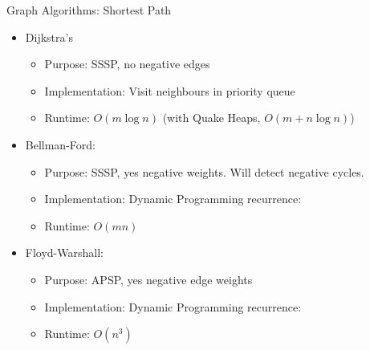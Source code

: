 \documentclass{beamer}
\begin{document}
\begin{frame}[t]{Graph Algorithms: Shortest Path}
  \begin{itemize}
    \item \alert{Dijkstra's}
    \begin{itemize}
        \item \alert{Purpose:} SSSP, no negative edges
        \item \alert{Implementation:} Visit neighbours in \alert{priority queue}
        \item \alert{Runtime:} $O(m \log n)$ (with \alert{Quake Heaps}, $O(m+n \log n)$)
    \end{itemize}
    \pause
    \item \alert{Bellman-Ford:}
    \begin{itemize}
        \item \alert{Purpose:} SSSP, yes negative weights. Will detect negative cycles.
        \item \alert{Implementation:} Dynamic Programming recurrence:
        \item \alert{Runtime:} $O(mn)$
    \end{itemize}
    \pause
    \item \alert{Floyd-Warshall:}
    \begin{itemize}
        \item \alert{Purpose:} APSP, yes negative edge weights
        \item \alert{Implementation:} Dynamic Programming recurrence:
        \item \alert{Runtime:} $O(n^3)$
    \end{itemize}
  \end{itemize}
\end{frame}
\end{document}
